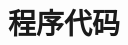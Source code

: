 
\appendix
\backmatter
\cleardoublepage
\pagestyle{appendixpage}
\renewcommand{\chapterlabel}{\appendixname} %


\chapter{程序代码}
\begin{spacing}{1.0}
  
  
  
\end{spacing}





